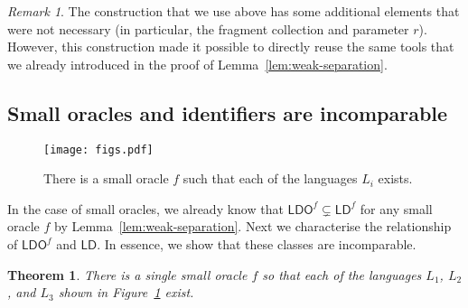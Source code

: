 \documentclass[11pt,a4paper]{article}
\newtheorem{theorem}{Theorem}
\theoremstyle{definition}
\theoremstyle{remark}
\newtheorem{remark}{Remark}
\newcommand{\ldo}{\mathsf{LDO}}
\newcommand{\ld}{\mathsf{LD}}
\begin{document}
\begin{remark}
    The construction that we use above has some additional elements that were not necessary (in particular, the fragment collection and parameter $r$). However, this construction made it possible to directly reuse the same tools that we already introduced in the proof of Lemma~\ref{lem:weak-separation}.
\end{remark}

\subsection{Small oracles and identifiers are incomparable}

\begin{figure}[t]
    \centering
    \texttt{[image: figs.pdf]}
    \caption{There is a small oracle $f$ such that each of the languages $L_i$ exists.}\label{fig:small}
\end{figure}

In the case of small oracles, we already know that $\ldo^f \subsetneq \ld^f$ for any small oracle $f$ by Lemma~\ref{lem:weak-separation}. Next we characterise the relationship of $\ldo^f$ and $\ld$. In essence, we show that these classes are incomparable.

\begin{theorem}\label{thm:small-ldof-ld}
    There is a single small oracle $f$ so that each of the languages $L_1$, $L_2$, and $L_3$ shown in Figure~\ref{fig:small} exist.
\end{theorem}
\end{document}
